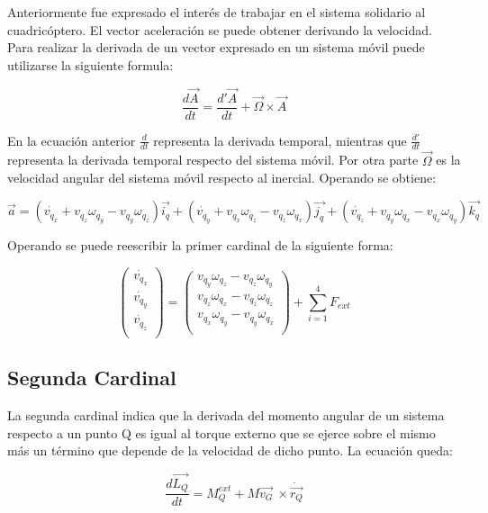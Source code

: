 \documentclass[main]{subfiles}
\begin{document}
Anteriormente fue expresado el inter\'es de trabajar en el sistema solidario al cuadric\'optero. 
El vector aceleraci\'on se puede obtener derivando la velocidad. Para realizar la derivada de un vector expresado en un sistema m\'ovil puede utilizarse la siguiente formula:

$$\frac{d\vec{A}}{dt} =\frac{d\prime\vec{A}}{dt}+\vec{\Omega}\times\vec{A} $$

En la ecuaci\'on anterior $\frac{d}{dt}$ representa la derivada temporal, mientras que $\frac{d\prime}{dt}$ representa la derivada temporal respecto del sistema m\'ovil. Por otra parte $\vec{\Omega}$ es la velocidad angular del sistema m\'ovil respecto al inercial. Operando se obtiene: 

$$\vec{a} = (\dot{v_{q_x}}+v_{q_z} \omega_{q_y} - v_{q_y} \omega_{q_z} )\vec{i_q} + (\dot{v_{q_y}}+v_{q_x} \omega_{q_z} - v_{q_z} \omega_{q_x} )\vec{j_q}+(\dot{v_{q_z}}+v_{q_y} \omega_{q_x} - v_{q_x} \omega_{q_y} )\vec{k_q} $$



Operando se puede reescribir la primer cardinal de la siguiente forma:

\begin{equation}
\left(\begin{array}{c}\dot{v_{q_x}}\\
\dot{v_{q_y}}\\
\dot{v_{q_z}}\\
\end{array} \right) = \left(\begin{array}{c}
v_{q_y} \omega_{q_z} - v_{q_z} \omega_{q_y}	\\
v_{q_z} \omega_{q_x} - v_{q_z} \omega_{q_z}\\
v_{q_x} \omega_{q_y} - v_{q_y} \omega_{q_x}\\
\end{array}\right) + \sum_{i=1}^4 F_{ext} 
\label{vpuntos}
\end{equation}


\subsection{Segunda Cardinal}

La segunda cardinal indica que la derivada del momento angular de un sistema respecto a un punto Q es igual al torque externo que se ejerce sobre el mismo m\'as un t\'ermino que depende de la velocidad de dicho punto. La ecuaci\'on queda:

$$\frac{d\vec{L_Q}}{dt} =M_Q^{ext}+M\vec{v_G}\ \times \dot{\vec{r_Q}} $$
\end{document}
